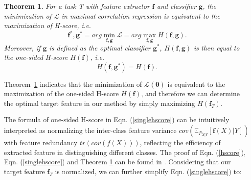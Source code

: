 \documentclass[letterpaper]{article} %
\newtheorem{theorem}{Theorem}
\begin{document}
\begin{theorem}
    For a task T with feature extractor $\boldsymbol{f}$ and classifier $\boldsymbol{g}$, the minimization of $\mathcal L$ in maximal correlation regression is equivalent to the maximization of H-score, \textit{i.e.}
    \begin{equation}
         \boldsymbol{f}^*, \boldsymbol{g}^* = arg \min_{\boldsymbol{f},\boldsymbol{g}}\mathcal L = arg \max_{\boldsymbol{f},\boldsymbol{g}} H(\boldsymbol{f}, \boldsymbol{g}).
    \end{equation}
     \noindent Moreover, if $\boldsymbol{g}$ is defined as the optimal classifier $\boldsymbol{g}^*$, $H(\boldsymbol{f},\boldsymbol{g})$ is then equal to the one-sided H-score $H(\boldsymbol{f})$,
    \textit{i.e.}
    \begin{equation}
    H(\boldsymbol{f}, \boldsymbol{g}^*) = H(\boldsymbol{f}) .
    \label{hscoremeaning}
    \end{equation}
    \label{theo:hscore}
\end{theorem}

Theorem~\ref{theo:hscore} indicates that the minimization of $\mathcal L(\boldsymbol{\theta})$ is equivalent to the maximization of the one-sided H-score $H(\boldsymbol{f})$, and therefore we can determine the optimal target feature in our method by simply maximizing $H(\boldsymbol{f}_T)$.

The formula of one-sided H-score in Eqn. (\ref{singlehscore}) can be intuitively interpreted as normalizing the inter-class feature variance $cov(\mathbb{E}_{P_{X|Y}}[\boldsymbol{f}(X)|Y])$ with feature redundancy $tr(cov(f(X)))$, reflecting the efficiency of extracted feature in distinguishing different classes. The proof of Eqn. (\ref{hscore}), Eqn. (\ref{singlehscore}) and Theorem \ref{theo:hscore} can be found in \citep{huang2019information, bao2019information,xu2020maximal}. Considering that our target feature $\boldsymbol{f}_T$ is normalized, we can further simplify Eqn. (\ref{singlehscore}) to:
\end{document}
